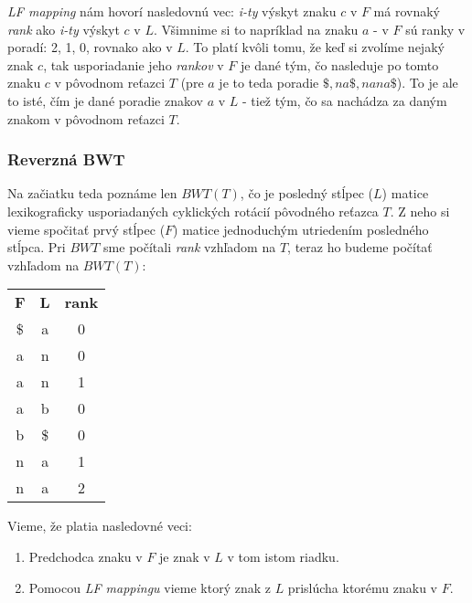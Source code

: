     \emph{LF mapping} nám hovorí nasledovnú vec: \emph{i-ty} výskyt znaku $c$ v $F$ má rovnaký \emph{rank} ako \emph{i-ty} výskyt $c$ v $L$. Všimnime si to napríklad na znaku $a$ - v $F$ sú ranky v poradí: 2, 1, 0, rovnako ako v $L$. To platí kvôli tomu, že keď si zvolíme nejaký znak $c$, tak usporiadanie jeho \emph{rankov} v $F$ je dané tým, čo nasleduje po tomto znaku $c$ v pôvodnom reťazci $T$ (pre $a$ je to teda poradie $\$, na\$, nana\$$). To je ale to isté, čím je dané poradie znakov $a$ v $L$ - tiež tým, čo sa nachádza za daným znakom v pôvodnom reťazci $T$.
    
    \subsubsection{Reverzná BWT}
        
     Na začiatku teda poznáme len $BWT(T)$, čo je posledný stĺpec ($L$) matice lexikograficky usporiadaných cyklických rotácií pôvodného reťazca $T$. Z neho si vieme spočitať prvý stĺpec ($F$) matice jednoduchým utriedením posledného stĺpca. Pri $BWT$ sme počítali \emph{rank} vzhľadom na $T$, teraz ho budeme počítať vzhľadom na $BWT(T)$:
    
    \bigskip
    
    \begin{center}
        \begin{tabular}{ c c c }
            \textbf{F}   & \textbf{L} & \textbf{rank} \\  
            \$           & a          & 0             \\
            a            & n          & 0             \\
            a            & n          & 1             \\
            a            & b          & 0             \\
            b            & \$         & 0             \\
            n            & a          & 1             \\
            n            & a          & 2             \\
        \end{tabular}
    \end{center}
    
    \bigskip
    
    Vieme, že platia nasledovné veci:
    
    \begin{enumerate}
        \item{Predchodca znaku v $F$ je znak v $L$ v tom istom riadku.}
        \item{Pomocou \emph{LF mappingu} vieme ktorý znak z $L$ prislúcha ktorému znaku v $F$.}
    \end{enumerate}
    
